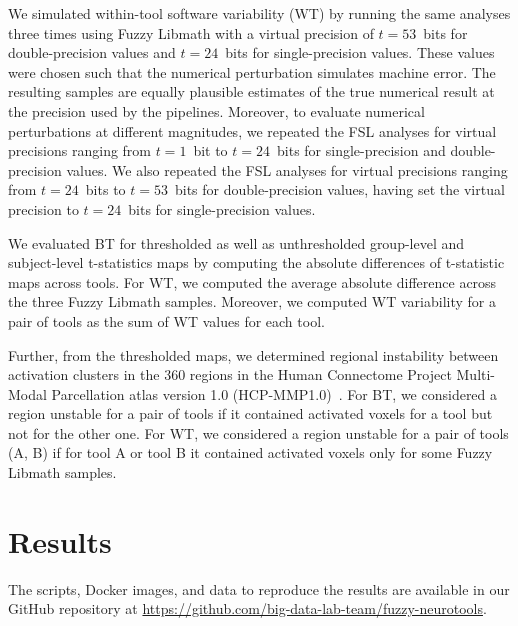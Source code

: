 \documentclass[11pt,onecolumn]{article}
\begin{document}
We simulated within-tool software variability (WT) by running the same analyses three
times using Fuzzy Libmath with a virtual precision of $t=53$~bits for
double-precision values and $t=24$~bits for single-precision values. These
values were chosen such that the numerical perturbation simulates machine
error. The resulting samples are equally plausible estimates of
the true
numerical result at the precision used by the pipelines. Moreover, to evaluate numerical perturbations at different magnitudes,
we repeated the FSL analyses for virtual
precisions ranging from $t=1$~bit to $t=24$~bits for single-precision
and double-precision values. We also repeated the FSL analyses for virtual
precisions ranging from $t=24$~bits to $t=53$~bits for double-precision values, having
set the virtual precision to $t=24$~bits for single-precision values.

We evaluated BT for thresholded as well as unthresholded
group-level and subject-level t-statistics maps by computing the absolute
differences of t-statistic maps across tools. For WT, we computed the
average absolute difference across the three Fuzzy Libmath samples.
Moreover, we computed WT variability for a pair of tools as the sum of WT values for each tool.

Further, from the thresholded maps, we determined regional instability
between activation clusters in the 360 regions in the Human Connectome
Project Multi-Modal Parcellation atlas version 1.0
(HCP-MMP1.0)~\cite{glasser2016multi}. For BT, we considered a region
unstable for a pair of tools if it contained activated voxels for a tool
but not for the other one. For WT, we considered a region unstable for a
pair of tools (A, B) if for tool A or tool B it contained activated voxels only for some Fuzzy Libmath
samples.

\section{Results}
The scripts, Docker images, and data to reproduce the results are available
in our GitHub repository at
\url{https://github.com/big-data-lab-team/fuzzy-neurotools}.
\end{document}
